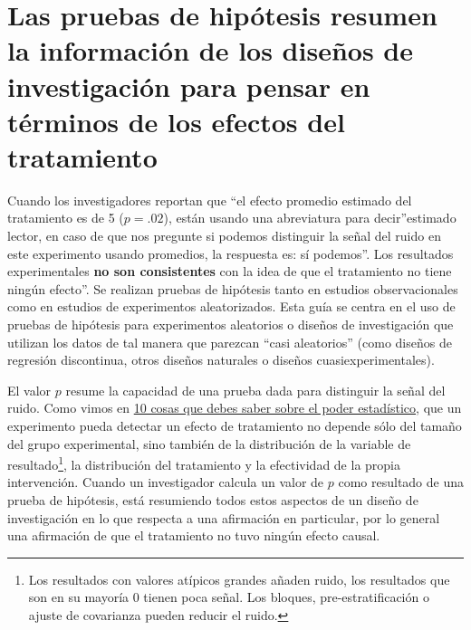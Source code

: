 \documentclass[
]{article}
\author{}
\date{\vspace{-2.5em}}
\begin{document}
{
\setcounter{tocdepth}{2}
\tableofcontents
}
\newcommand{\bX}{\mathbf{X}}
\newcommand{\bZ}{\mathbf{Z}}
\newcommand{\bz}{\mathbf{z}}
\newcommand{\bbeta}{\boldsymbol{\beta}}
\newcommand{\bSigma}{\boldsymbol{\Sigma}}

\hypertarget{las-pruebas-de-hipuxf3tesis-resumen-la-informaciuxf3n-de-los-diseuxf1os-de-investigaciuxf3n-para-pensar-en-tuxe9rminos-de-los-efectos-del-tratamiento}{%
\section{Las pruebas de hipótesis resumen la información de los diseños de investigación para pensar en términos de los efectos del tratamiento}\label{las-pruebas-de-hipuxf3tesis-resumen-la-informaciuxf3n-de-los-diseuxf1os-de-investigaciuxf3n-para-pensar-en-tuxe9rminos-de-los-efectos-del-tratamiento}}

Cuando los investigadores reportan que ``el efecto promedio estimado del tratamiento es de 5 (\(p = .02\)), están usando una abreviatura para decir''estimado lector, en caso de que nos pregunte si podemos distinguir la señal del ruido en este
experimento usando promedios, la respuesta es: sí podemos''. Los resultados experimentales \textbf{no son consistentes} con la idea de que el tratamiento no tiene ningún efecto''. Se realizan pruebas de hipótesis tanto en estudios observacionales como en estudios de experimentos aleatorizados. Esta guía se centra en el uso de pruebas de hipótesis para experimentos aleatorios o diseños de investigación que utilizan los datos de tal manera que parezcan ``casi aleatorios'' (como diseños de regresión discontinua, otros diseños naturales o diseños cuasiexperimentales).

El valor \(p\) resume la capacidad de una prueba dada para
distinguir la señal del ruido. Como vimos en \href{https://egap.org/resource/10-things-to-know-about-statistical-power}{10 cosas que debes saber sobre el poder estadístico}, que un experimento pueda detectar un efecto de tratamiento no depende
sólo del tamaño del grupo experimental, sino también de la distribución de la variable de resultado\footnote{Los resultados con valores atípicos grandes añaden ruido, los resultados que son en su mayoría 0 tienen
  poca señal. Los bloques, pre-estratificación o ajuste de covarianza pueden
  reducir el ruido.}, la distribución del tratamiento y la efectividad
de la propia intervención. Cuando un investigador calcula un valor de \(p\) como
resultado de una prueba de hipótesis, está resumiendo todos estos aspectos de un
diseño de investigación en lo que respecta a una afirmación en particular, por lo general una afirmación de que el tratamiento no tuvo ningún efecto causal.
\end{document}

